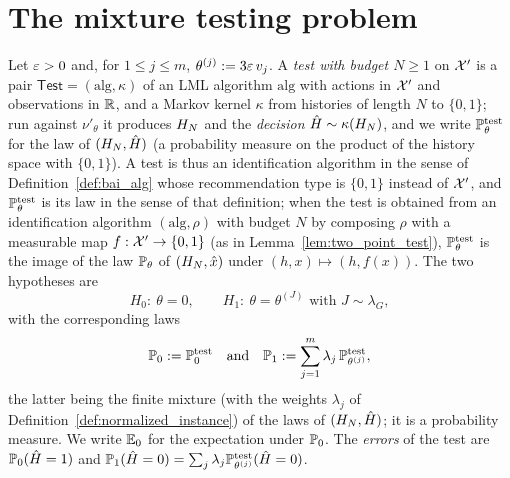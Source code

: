 \section{The mixture testing problem}
\label{sec:lower_adaptive_test}

\begin{definition}\label{def:mixture_test}
\leanok
{}
Let $\varepsilon > 0$ and, for $1 \le j \le m$, $\theta^{(j)} := 3\varepsilon\, v_j$. A \emph{test with budget
$N \ge 1$} on $\mathcal{X}'$ is a pair $\mathsf{Test} = (\mathrm{alg}, \kappa)$ of an LML algorithm
$\mathrm{alg}$ with actions in $\mathcal{X}'$ and observations in $\mathbb{R}$, and a Markov kernel $\kappa$
from histories of length $N$ to $\{0,1\}$; run against $\nu'_\theta$ it produces
$H_N$ and the \emph{decision} $\hat H \sim \kappa(H_N)$, and we write
$\mathbb{P}^{\mathrm{test}}_\theta$ for the law of $(H_N,\hat H)$ (a probability measure on the
product of the history space with $\{0,1\}$). A test is thus an identification algorithm in the
sense of Definition~\ref{def:bai_alg} whose recommendation type is $\{0,1\}$ instead of $\mathcal{X}'$,
and $\mathbb{P}^{\mathrm{test}}_\theta$ is its law in the sense of that definition; when the test is
obtained from an identification algorithm $(\mathrm{alg},\rho)$ with budget $N$ by composing
$\rho$ with a measurable map $f : \mathcal{X}' \to \{0,1\}$ (as in Lemma~\ref{lem:two_point_test}),
$\mathbb{P}^{\mathrm{test}}_\theta$ is the image of the law $\mathbb{P}_\theta$ of $(H_N,\hat{x})$ under
$(h, x) \mapsto (h, f(x))$. The two hypotheses are
\[
  H_0 :\ \theta = 0, \qquad H_1 :\ \theta = \theta^{(J)} \text{ with } J \sim \lambda_G ,
\]
with the corresponding laws
\[
  \mathbb{P}_0 := \mathbb{P}^{\mathrm{test}}_0 \quad\text{and}\quad
  \mathbb{P}_1 := \sum_{j=1}^m \lambda_j\,\mathbb{P}^{\mathrm{test}}_{\theta^{(j)}} ,
\]
the latter being the finite mixture (with the weights $\lambda_j$ of
Definition~\ref{def:normalized_instance}) of the laws of $(H_N,\hat H)$; it is a
probability measure. We write $\mathbb{E}_0$ for the expectation under $\mathbb{P}_0$. The \emph{errors} of
the test are $\mathbb{P}_0(\hat H = 1)$ and
$\mathbb{P}_1(\hat H = 0) = \sum_j\lambda_j\mathbb{P}^{\mathrm{test}}_{\theta^{(j)}}(\hat H = 0)$.
\end{definition}

